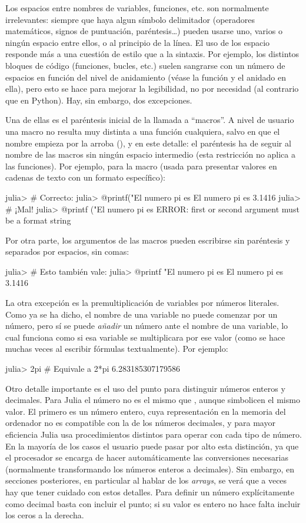 ﻿\documentclass[spanish]{article}
\begin{document}
Los espacios entre nombres de variables, funciones, etc. son normalmente irrelevantes: siempre que haya algun símbolo delimitador (operadores matemáticos, signos de puntuación, paréntesis\ldots) pueden usarse uno, varios o ningún espacio entre ellos, o al principio de la línea. El uso de los espacio responde más a una cuestión de estilo que a la sintaxis. Por ejemplo, los distintos bloques de código (funciones, bucles, etc.) suelen sangrarse con un número de espacios en función del nivel de anidamiento (véase la función  y el  anidado en ella), pero esto se hace para mejorar la legibilidad, no por necesidad (al contrario que en Python). Hay, sin embargo, dos excepciones.

Una de ellas es el paréntesis inicial de la llamada a ``macros''. A nivel de usuario una macro no resulta muy distinta a una función cualquiera, salvo en que el nombre empieza por la arroba (), y en este detalle: el paréntesis ha de seguir al nombre de las macros sin ningún espacio intermedio (esta restricción no aplica a las funciones). Por ejemplo, para la macro  (usada para presentar valores en cadenas de texto con un formato específico):

julia> # Correcto:
julia> @printf("El numero pi es %
El numero pi es 3.1416
julia> # ¡Mal!
julia> @printf ("El numero pi es %
ERROR: first or second argument must be a format string

Por otra parte, los argumentos de las macros pueden escribirse sin
paréntesis y separados por espacios, sin comas:

julia> # Esto también vale:
julia> @printf "El numero pi es %
El numero pi es 3.1416

La otra excepción es la premultiplicación de variables por números literales. Como ya se ha dicho, el nombre de una variable no puede comenzar por un número, pero sí se puede \emph{añadir} un número ante el nombre de una variable, lo cual funciona como si esa variable se multiplicara por ese valor (como se hace muchas veces al escribir fórmulas textualmente). Por ejemplo:

julia> 2pi # Equivale a 2*pi
6.283185307179586

Otro detalle importante es el uso del punto para distinguir números enteros y decimales. Para Julia el número  no es el mismo que , aunque simbolicen el mismo valor. El primero es un número entero, cuya representación en la memoria del ordenador no es compatible con la de los números decimales, y para mayor eficiencia Julia usa procedimientos distintos para operar con cada tipo de número. En la mayoría de los casos el usuario puede pasar por alto esta distinción, ya que el procesador se encarga de hacer automáticamente las conversiones necesarias (normalmente transformando los números enteros a decimales). Sin embargo, en secciones posteriores, en particular al hablar de los \emph{arrays}, se verá que a veces hay que tener cuidado con estos detalles. Para definir un número explícitamente como decimal basta con incluir el punto; si su valor es entero no hace falta incluir los ceros a la derecha.
\end{document}
